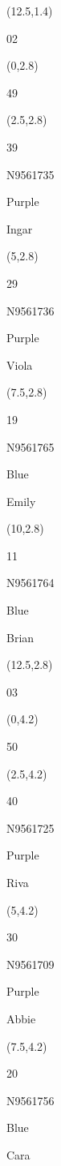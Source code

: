 \documentclass[a4paper]{article}
\newcommand{\myseat}[4]{%
\vspace{-0.1cm}
\parbox[t][2.2cm][t]{3.5cm}{
\small #1 %
\begin{description}
\vspace{-0.1cm}
\item [ID:] #2
\vspace{-0.1cm}
\item [Team:] #3 \normalsize
\vspace{-0.1cm}
\item \normalsize #4
\vspace{-0.1cm}
\end{description}
}
}
\begin{document}
\begin{CJK}{UTF8}{cyberbit}
\begin{textblock}{2.5}(12.5,1.4)
\textblockcolor{}
	\myseat{02}{}{}{}
\end{textblock}

\begin{textblock}{2.5}(0,2.8)
\textblockcolor{}
	\myseat{49}{}{}{}
\end{textblock}

\begin{textblock}{2.5}(2.5,2.8)
	\myseat{39}{N9561735}{Purple}{Ingar}
\end{textblock}

\begin{textblock}{2.5}(5,2.8)
	\myseat{29}{N9561736}{Purple}{Viola}
\end{textblock}

\begin{textblock}{2.5}(7.5,2.8)
	\myseat{19}{N9561765}{Blue}{Emily}
\end{textblock}

\begin{textblock}{2.5}(10,2.8)
	\myseat{11}{N9561764}{Blue}{Brian}
\end{textblock}

\begin{textblock}{2.5}(12.5,2.8)
\textblockcolor{}
	\myseat{03}{}{}{}
\end{textblock}

\begin{textblock}{2.5}(0,4.2)
\textblockcolor{}
	\myseat{50}{}{}{}
\end{textblock}

\begin{textblock}{2.5}(2.5,4.2)
	\myseat{40}{N9561725}{Purple}{Riva}
\end{textblock}

\begin{textblock}{2.5}(5,4.2)
	\myseat{30}{N9561709}{Purple}{Abbie}
\end{textblock}

\begin{textblock}{2.5}(7.5,4.2)
	\myseat{20}{N9561756}{Blue}{Cara}
\end{textblock}


\end{CJK}
\end{document}
